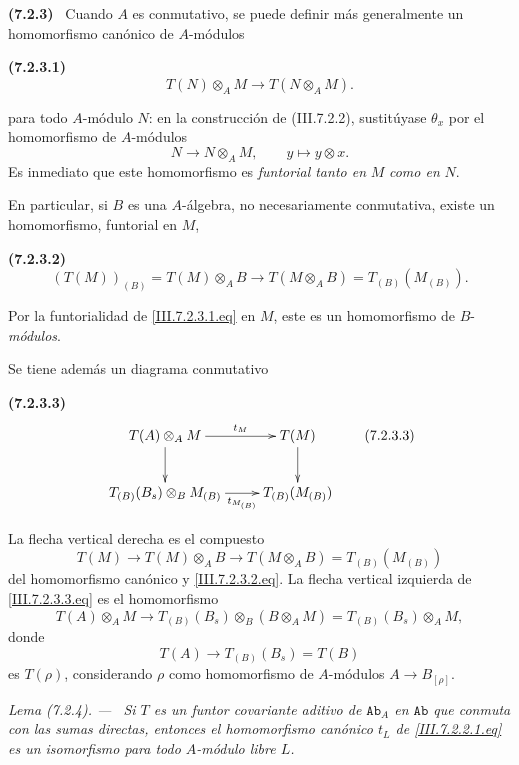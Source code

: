 \documentclass[10pt,oneside]{book}
\newcommand{\cat}[1]{\mathtt{#1}}
\newcommand{\sref}[2][]{\textup{(#2)}}
\newcommand{\oldpage}[2][]{\setcounter{footnote}{0}\marginpar{\scriptsize\textbf{#1}~|~#2}\ignorespaces}
\newenvironment{env}[1][]{\par\medskip\noindent\textbf{(#1)}\ }{\par}
\newenvironment{lemma}[1][]{\par\medskip\noindent\itshape Lema (#1). ---\ }{\par}
\begin{document}
\begin{env}[7.2.3]
\label{III.7.2.3}
Cuando $A$ es conmutativo, se puede definir más generalmente un
homomorfismo canónico de $A$-módulos
\begin{env}[7.2.3.1]
\label{III.7.2.3.1}
\[
  T(N)\otimes_A M
  \longrightarrow
  T(N\otimes_A M).
  \tag{7.2.3.1}\label{III.7.2.3.1.eq}
\]
\end{env}
para todo $A$-módulo $N$: en la construcción de
\sref{III.7.2.2}, sustitúyase $\theta_x$ por el homomorfismo de
$A$-módulos
\[
  N\longrightarrow N\otimes_A M,
  \qquad
  y\longmapsto y\otimes x.
\]
Es inmediato que este homomorfismo es \emph{funtorial tanto en} $M$ \emph{como
en} $N$.

\oldpage[III]{178}
En particular, si $B$ es una $A$-álgebra, no necesariamente
conmutativa, existe un homomorfismo, funtorial en $M$,
\begin{env}[7.2.3.2]
\label{III.7.2.3.2}
\[
  (T(M))_{(B)}
  =
  T(M)\otimes_A B
  \longrightarrow
  T(M\otimes_A B)
  =
  T_{(B)}(M_{(B)}).
  \tag{7.2.3.2}\label{III.7.2.3.2.eq}
\]
\end{env}
Por la funtorialidad de \eqref{III.7.2.3.1.eq} en $M$, este es un
homomorfismo de $B$-\emph{módulos}.

Se tiene además un diagrama conmutativo
\begin{env}[7.2.3.3]
\label{III.7.2.3.3}
\[
\xymatrix{
  T(A)\otimes_A M
    \ar[r]^-{t_M}\ar[d]
  & T(M)\ar[d]
  \\
  T_{(B)}(B_s)\otimes_B M_{(B)}
    \ar[r]_-{t_{M_{(B)}}}
  & T_{(B)}(M_{(B)})
}
\tag{7.2.3.3}\label{III.7.2.3.3.eq}
\]
\end{env}
La flecha vertical derecha es el compuesto
\[
  T(M)
  \longrightarrow
  T(M)\otimes_A B
  \longrightarrow
  T(M\otimes_A B)
  =
  T_{(B)}(M_{(B)})
\]
del homomorfismo canónico y \eqref{III.7.2.3.2.eq}. La flecha
vertical izquierda de \eqref{III.7.2.3.3.eq} es el homomorfismo
\[
  T(A)\otimes_A M
  \longrightarrow
  T_{(B)}(B_s)\otimes_B(B\otimes_A M)
  =
  T_{(B)}(B_s)\otimes_A M,
\]
donde
\[
  T(A)\longrightarrow T_{(B)}(B_s)=T(B)
\]
es $T(\rho)$, considerando $\rho$ como homomorfismo de
$A$-módulos $A\to B_{[\rho]}$.
\end{env}

\begin{lemma}[7.2.4]
\label{III.7.2.4}
Si $T$ es un funtor covariante aditivo de $\cat{Ab}_A$ en
$\cat{Ab}$ que conmuta con las sumas directas, entonces el
homomorfismo canónico $t_L$ de \eqref{III.7.2.2.1.eq} es un
isomorfismo para todo $A$-módulo libre $L$.
\end{lemma}
\end{document}
